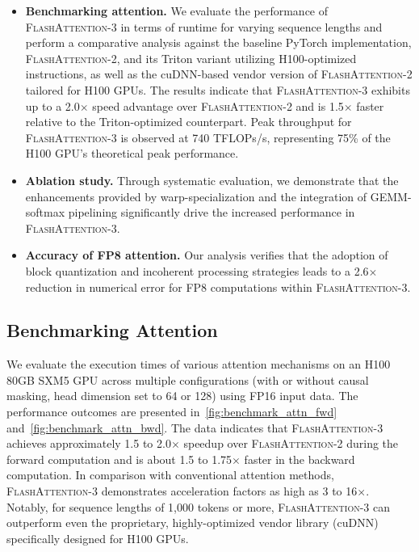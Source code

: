 \begin{algorithm}[H]
\begin{algorithmic}[1]
\begin{enumerate}
\begin{itemize}

\item \textbf{Benchmarking attention.} We evaluate the performance of \textsc{FlashAttention-3} in terms of runtime for varying sequence lengths and perform a comparative analysis against the baseline PyTorch implementation, \textsc{FlashAttention-2}, and its Triton variant utilizing H100-optimized instructions, as well as the cuDNN-based vendor version of \textsc{FlashAttention-2} tailored for H100 GPUs. The results indicate that \textsc{FlashAttention-3} exhibits up to a 2.0$\times$ speed advantage over \textsc{FlashAttention-2} and is 1.5$\times$ faster relative to the Triton-optimized counterpart. Peak throughput for \textsc{FlashAttention-3} is observed at 740 TFLOPs/s, representing 75\% of the H100 GPU's theoretical peak performance.
\item \textbf{Ablation study.} Through systematic evaluation, we demonstrate that the enhancements provided by warp-specialization and the integration of GEMM-softmax pipelining significantly drive the increased performance in \textsc{FlashAttention-3}.
\item \textbf{Accuracy of FP8 attention.} Our analysis verifies that the adoption of block quantization and incoherent processing strategies leads to a 2.6$\times$ reduction in numerical error for FP8 computations within \textsc{FlashAttention-3}.
\end{itemize}

\subsection{Benchmarking Attention}
\label{subsec:benchmark_attn}

We evaluate the execution times of various attention mechanisms on an H100 80GB SXM5 GPU across multiple configurations (with or without causal masking, head dimension set to 64 or 128) using FP16 input data. The performance outcomes are presented in~\cref{fig:benchmark_attn_fwd} and~\cref{fig:benchmark_attn_bwd}. The data indicates that \textsc{FlashAttention-3} achieves approximately 1.5 to 2.0$\times$ speedup over \textsc{FlashAttention-2} during the forward computation and is about 1.5 to 1.75$\times$ faster in the backward computation. In comparison with conventional attention methods, \textsc{FlashAttention-3} demonstrates acceleration factors as high as 3 to 16$\times$. Notably, for sequence lengths of 1,000 tokens or more, \textsc{FlashAttention-3} can outperform even the proprietary, highly-optimized vendor library (cuDNN) specifically designed for H100 GPUs.


\end{enumerate}
\end{algorithmic}
\end{algorithm}
